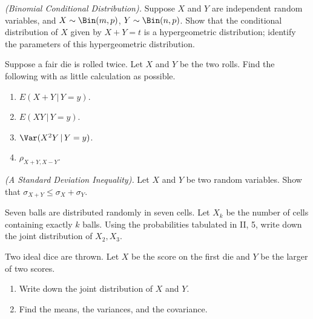 \begin{problem}[Handout 15, \# 14]
  \emph{(Binomial Conditional Distribution).} Suppose \(X\) and \(Y\) are
  independent random variables, and \(X\sim\Bin(m,p)\),
  \(Y\sim\Bin(n,p)\). Show that the conditional distribution of \(X\) given
  by \(X+Y=t\) is a hypergeometric distribution; identify the parameters of
  this hypergeometric distribution.
\end{problem}
\begin{solution}

\end{solution}
\newpage

\begin{problem}[Handout 15, \# 15]
  Suppose a fair die is rolled twice. Let \(X\) and \(Y\) be the two
  rolls. Find the following with as little calculation as possible.
  \begin{enumerate}[label=(\alph*),noitemsep]
  \item \(E(X+Y\,|\,Y=y)\).
  \item \(E(XY\,|\,Y=y)\).
  \item \(\Var(X^2Y\,|\,Y=y)\).
  \item \(\rho_{X+Y,X-Y}\).
  \end{enumerate}
\end{problem}
\begin{solution}

\end{solution}
\newpage

\begin{problem}[Handout 15, \# 16]
  \emph{(A Standard Deviation Inequality).} Let \(X\) and \(Y\) be two
  random variables. Show that \(\sigma_{X+Y}\leq\sigma_X+\sigma_Y\).
\end{problem}
\begin{solution}

\end{solution}
\newpage

\begin{problem}[Handout 15, \# 17]
  Seven balls are distributed randomly in seven cells. Let \(X_k\) be
  the number of cells containing exactly \(k\) balls. Using the
  probabilities tabulated in II, 5, write down the joint distribution of
  \(X_2,X_3\).
\end{problem}
\begin{solution}

\end{solution}
\newpage

\begin{problem}[Handout 15, \# 18]
  Two ideal dice are thrown. Let \(X\) be the score on the first die and
  \(Y\) be the larger of two scores.
  \begin{enumerate}[label=(\alph*),noitemsep]
  \item Write down the joint distribution of \(X\) and \(Y\).
  \item Find the means, the variances, and the covariance.
  \end{enumerate}
  \end{problem}
\begin{solution}

\end{solution}
\newpage


